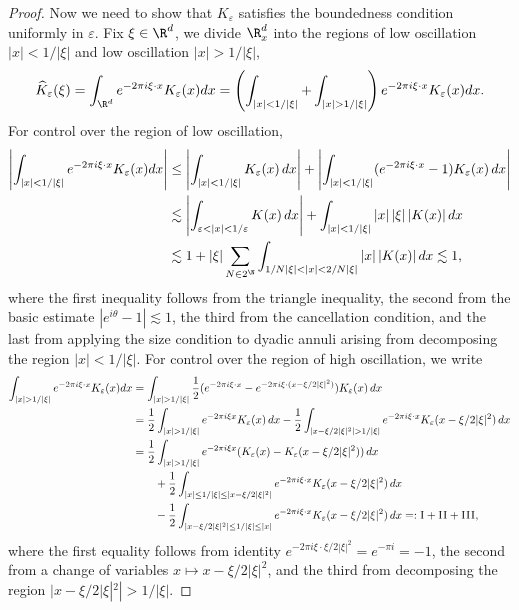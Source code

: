 \documentclass[reqno]{amsart}
\theoremstyle{definition}
\theoremstyle{remark}
\renewcommand{\epsilon}{\varepsilon}
\begin{document}
\begin{proof}
	Now we need to show that $K_\epsilon$ satisfies the boundedness condition uniformly in $\epsilon$. Fix $\xi \in \R^d$, we divide $\R^d_x$ into the regions of low oscillation $|x| < 1/|\xi|$ and low oscillation $|x| > 1/|\xi|$, 
		\[ \widehat K_\epsilon (\xi) = \int_{\R^d} e^{-2\pi i \xi \cdot x} K_\epsilon (x) dx = \left( \int_{|x| < 1/|\xi|} + \int_{|x| > 1/|\xi|} \right) e^{-2\pi i \xi \cdot x} K_\epsilon (x) dx. \]
	For control over the region of low oscillation, 
		\begin{align*}
			 \left| \int_{|x| < 1/|\xi|} e^{-2\pi i \xi \cdot x} K_\epsilon (x) dx \right| 
			 	&\leq \left| \int_{|x| < 1/|\xi|} K_\epsilon (x) \, dx \right| +  \left| \int_{|x| < 1/|\xi|} (e^{-2\pi i \xi \cdot x} - 1) K_\epsilon (x)\,  dx \right| \\
			 	&\lesssim \left| \int_{\epsilon < |x| <  1/\epsilon} K (x) \, dx \right|  + \int_{|x| < 1/|\xi|} |x| \, |\xi| \,  |K (x)| \, dx \\
			 	&\lesssim 1 + |\xi| \sum_{N \in 2^\N} \int_{1/N|\xi| < |x| < 2/N|\xi|} |x| \, |K(x)| \, dx \lesssim 1,
		\end{align*}	 
	where the first inequality follows from the triangle inequality, the second from the basic estimate $|e^{i \theta} - 1| \lesssim 1$, the third from the cancellation condition, and the last from applying the size condition to dyadic annuli arising from decomposing the region $|x| < 1/|\xi|$. For control over the region of high oscillation, we write
		\begin{align*}
			\int_{|x| > 1/|\xi|} e^{-2\pi i \xi \cdot x} K_\epsilon (x) dx 
				&=  \int_{|x| > 1/|\xi| } \frac12 (e^{-2 \pi i \xi \cdot  x}  - e^{- 2 \pi i \xi \cdot  (x - \xi/2|\xi|^2)})K_\epsilon (x) \, dx \\
				&= \frac12\int_{|x| > 1/|\xi|} e^{-2 \pi i \xi x} K_\epsilon (x) \, dx - \frac12\int_{|x - \xi/2|\xi|^2| > 1/|\xi|} e^{- 2 \pi i \xi \cdot  x} K_\epsilon (x - \xi/2|\xi|^2) \, dx\\
				&= \frac12\int_{|x| > 1/|\xi|} e^{-2 \pi i \xi x} (K_\epsilon (x) - K_\epsilon (x - \xi/2|\xi|^2)) \, dx \\
				&\qquad+ \frac12 \int_{|x| \leq 1/|\xi| \leq |x - \xi/2|\xi|^2|} e^{-2\pi i \xi \cdot x}K_\epsilon (x - \xi/2|\xi|^2) \, dx \\
				&\qquad - \frac12 \int_{|x - \xi/2|\xi|^2| \leq 1/|\xi| \leq |x|}  e^{-2\pi i \xi \cdot x}K_\epsilon (x - \xi/2|\xi|^2) \, dx =: \textsc{I} + \textsc{II} + \textsc{III},
		\end{align*}	
	where the first equality follows from identity $e^{-2\pi i \xi \cdot \xi/2|\xi|^2} = e^{-\pi i} = - 1$, the second from a change of variables $x \mapsto x - \xi/2|\xi|^2$, and the third from decomposing the region $|x - \xi/2|\xi|^2| >1/|\xi|$. 

\end{proof}
\end{document}
